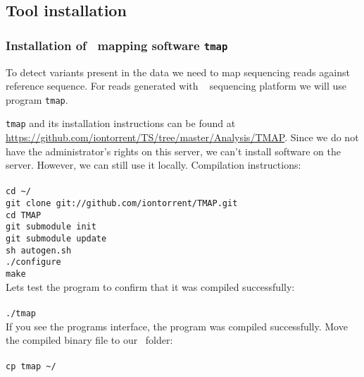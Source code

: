 \subsection{Tool installation}
\subsubsection{Installation of \IonTorrent~mapping software \texttt{tmap}}
To detect variants present in the data we need to map sequencing
reads against reference sequence. For reads generated with \IonTorrent~
sequencing platform we will use program \texttt{tmap}.

\texttt{tmap} and its installation instructions can
be found at \url{https://github.com/iontorrent/TS/tree/master/Analysis/TMAP}.
Since we do not have the administrator's rights on this server, we can't install
software on the server. However, we can still use it locally.
Compilation instructions:\\~\\
\texttt{cd \textasciitilde/\progDir}\\
\texttt{git clone git://github.com/iontorrent/TMAP.git}\\
\texttt{cd TMAP}\\
\texttt{git submodule init}\\
\texttt{git submodule update}\\
\texttt{sh autogen.sh}\\
\texttt{./configure}\\
\texttt{make}\\

Lets test the program to confirm that it was compiled successfully:\\~\\
\texttt{./tmap}\\

If you see the programs interface, the program was compiled successfully.
Move the compiled binary file to our \texttt{\binDir}~folder:\\~\\
\texttt{cp tmap \textasciitilde/\binDir}\\
